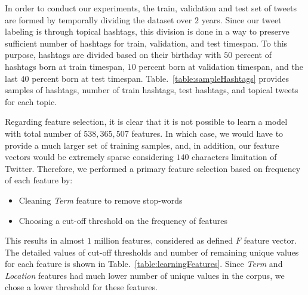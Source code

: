 \label{label:split}
In order to conduct our experiments, the train, validation and test set of tweets are formed by temporally dividing the dataset over $2$ years. Since our tweet labeling is through topical hashtags, this division is done in a way to preserve sufficient number of hashtags for train, validation, and test timespan. To this purpose, hashtags are divided based on their birthday with $50$ percent of hashtags born at train timespan, $10$ percent born at validation timespan, and the last $40$ percent born at test timespan.
Table.~\ref{table:sampleHashtags} provides samples of hashtags, number of train hashtags, test hashtags, and topical tweets for each topic. %

Regarding feature selection, it is clear that it is not possible to learn a model with total number of $538,365,507$ features. In which case, we would have to provide a much larger set of training samples, and, in addition, our feature vectors would be extremely sparse considering $140$ characters limitation of Twitter. Therefore, we performed a primary feature selection based on frequency of each feature by:
\begin{itemize}
\item Cleaning \textit{Term} feature to remove stop-words
\item Choosing a cut-off threshold on the frequency of features
\end{itemize} 
This results in almost $1$ million features, considered as defined $F$ feature vector. The detailed values of cut-off thresholds and number of remaining unique values for each feature is shown in Table.~\ref{table:learningFeatures}. Since \textit{Term} and \textit{Location} features had much lower number of unique values in the corpus, we chose a lower threshold for these features.

